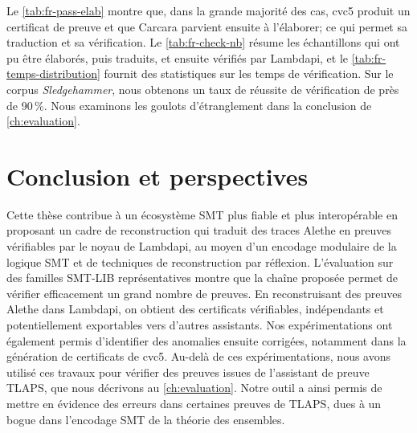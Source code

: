 \begin{table}[tb]
\centering
\caption{Temps de vérification de Lambdapi (ms).}
%
\label{tab:fr-temps-distribution}
\end{table}


Le \cref{tab:fr-pass-elab} montre que, dans la grande majorité des cas, cvc5 produit un certificat de preuve et que Carcara parvient ensuite à l'élaborer; ce qui permet sa traduction et sa vérification.
Le \cref{tab:fr-check-nb} résume les échantillons qui ont pu être élaborés, puis traduits, et ensuite vérifiés par Lambdapi, et le \cref{tab:fr-temps-distribution} fournit des statistiques sur les temps de vérification.
Sur le corpus \emph{Sledgehammer}, nous obtenons un taux de réussite de vérification de près de 90\,\%.
Nous examinons les goulots d'étranglement dans la conclusion de \cref{ch:evaluation}.

\section*{Conclusion et perspectives}

Cette thèse contribue à un écosystème SMT plus fiable et plus interopérable en proposant un cadre de reconstruction qui traduit des traces Alethe en preuves vérifiables par le noyau de Lambdapi, au moyen d'un encodage modulaire de la logique SMT et de techniques de reconstruction par réflexion.
L'évaluation sur des familles SMT-LIB représentatives montre que la chaîne proposée permet de vérifier efficacement un grand nombre de preuves.
En reconstruisant des preuves Alethe dans Lambdapi, on obtient des certificats vérifiables, indépendants et potentiellement exportables vers d'autres assistants.
Nos expérimentations ont également permis d'identifier des anomalies ensuite corrigées, notamment dans la génération de certificats de cvc5.
Au-delà de ces expérimentations, nous avons utilisé ces travaux pour vérifier des preuves issues de l'assistant de preuve TLAPS, que nous décrivons au \cref{ch:evaluation}.
Notre outil a ainsi permis de mettre en évidence des erreurs dans certaines preuves de TLAPS, dues à un bogue dans l'encodage SMT de la théorie des ensembles.

